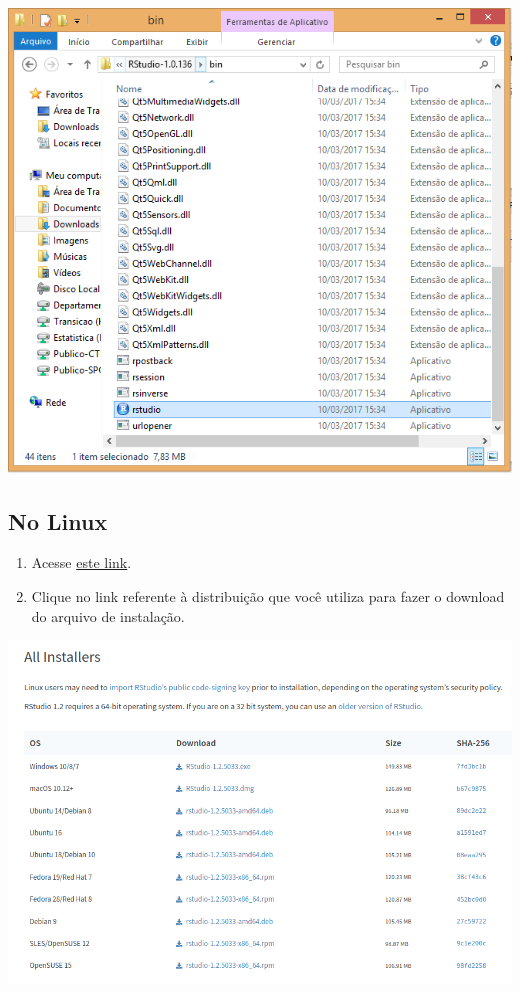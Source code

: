 \documentclass[
]{book}
\begin{document}
\begin{center}\includegraphics[width=9.07in]{img/instalacao/rstudio-bin} \end{center}

\hypertarget{no-linux-1}{%
\subsection{No Linux}\label{no-linux-1}}

\begin{enumerate}
\def\labelenumi{\arabic{enumi}.}
\item
  Acesse \href{https://www.rstudio.com/products/rstudio/download/\#download}{este link}.
\item
  Clique no link referente à distribuição que você utiliza para fazer o download do arquivo de instalação.
\end{enumerate}

\begin{center}\includegraphics[width=12.15in]{img/instalacao/rstudio-linux} \end{center}
\end{document}
